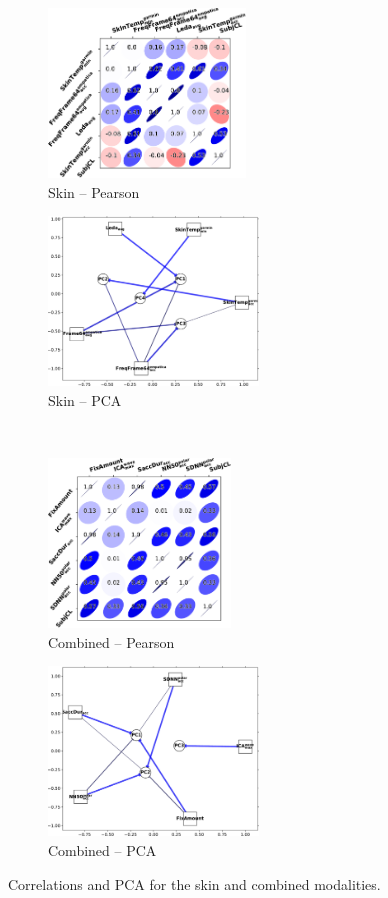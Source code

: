 \documentclass[output=paper]{langsci/langscibook}
\begin{document}
\begin{figure}
    \begin{subfigure}{0.5\textwidth}\centering
        \includegraphics[height=4.5cm]{figures/skin-pearson-cropped.pdf}
        \caption{Skin -- Pearson}
    \end{subfigure}%
    \begin{subfigure}{0.5\textwidth}\centering
        \includegraphics[height=4.5cm]{figures/skin-PCA-cropped.pdf}
        \caption{Skin -- PCA}
    \end{subfigure}\bigskip\\
    \begin{subfigure}{0.5\textwidth}\centering
        \includegraphics[height=4.5cm]{figures/all-pearson-cropped.pdf}
        \caption{Combined -- Pearson}
    \end{subfigure}%
    \begin{subfigure}{0.5\textwidth}\centering
        \includegraphics[height=4.5cm]{figures/all-PCA-cropped.pdf}
        \caption{Combined -- PCA}
    \end{subfigure}
    \caption{Correlations and PCA for the skin and combined modalities.\label{fig:plotscorrpca3}}
\end{figure}
\end{document}
